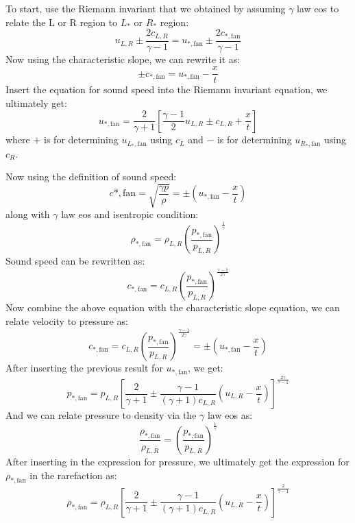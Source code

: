 To start, use the Riemann invariant that we obtained by assuming $\gamma$ law eos to relate
the L or R region to $L_*$ or $R_*$ region:
\begin{equation}
u_{L,R} \pm \frac{2c_{L,R}}{\gamma - 1} = u_{*,\mathrm{fan}} \pm \frac{2c_{*,\mathrm{fan}}}{\gamma - 1}
\end{equation}
Now using the characteristic slope, we can rewrite it as:
\begin{equation}
\pm c_{*,\mathrm{fan}} = u_{*,\mathrm{fan}} - \frac{x}{t}
\end{equation}
Insert the equation for sound speed into the Riemann invariant equation, we ultimately get:
\begin{equation}
u_{*,\mathrm{fan}} = \frac{2}{\gamma + 1} \left[ \frac{\gamma - 1}{2}u_{L,R} \pm c_{L,R} + \frac{x}{t}\right]
\end{equation}
where $+$ is for determining $u_{L_*,\mathrm{fan}}$ using $c_L$ and
$-$ is for determining $u_{R_*,\mathrm{fan}}$ using $c_R$.

Now using the definition of sound speed:
\begin{equation}
c{*,\mathrm{fan}} = \sqrt{\frac{\gamma p}{\rho}} = \pm (u_{*,\mathrm{fan}} - \frac{x}{t})
\end{equation}
along with $\gamma$ law eos and isentropic condition:
\begin{equation}
\rho_{*,\mathrm{fan}} = \rho_{L,R}\left( \frac{p_{*,\mathrm{fan}}}{p_{L,R}} \right)^{\frac{1}{\gamma}}
\end{equation}
Sound speed can be rewritten as:
\begin{equation}
c_{*,\mathrm{fan}} = c_{L,R} \left( \frac{p_{*,\mathrm{fan}}}{p_{L,R}} \right)^{\frac{\gamma - 1}{2 \gamma}}
\end{equation}
Now combine the above equation with the characteristic slope equation, we can relate velocity to pressure as:
\begin{equation}
c_{*,\mathrm{fan}} = c_{L,R} \left( \frac{p_{*,\mathrm{fan}}}{p_{L,R}} \right)^{\frac{\gamma - 1}{2 \gamma}} = \pm (u_{*,\mathrm{fan}} - \frac{x}{t})
\end{equation}
After inserting the previous result for $u_{*,\mathrm{fan}}$, we get:
\begin{equation}
p_{*,\mathrm{fan}} = p_{L,R} \left[\frac{2}{\gamma + 1} \pm \frac{\gamma - 1}{(\gamma + 1) c_{L,R}} \left(u_{L,R} - \frac{x}{t}\right)\right]^{\frac{2 \gamma}{\gamma - 1}}
\end{equation}
And we can relate pressure to density via the $\gamma$ law eos as:
\begin{equation}
\frac{\rho_{*,\mathrm{fan}}}{\rho_{L,R}} = \left(\frac{p_{*,\mathrm{fan}}}{p_{L,R}}\right)^{\frac{1}{\gamma}}
\end{equation}
After inserting in the expression for pressure, we ultimately get the expression for $\rho_{*,\mathrm{fan}}$ in the rarefaction as:
\begin{equation}
\rho_{*,\mathrm{fan}} = \rho_{L,R} \left[\frac{2}{\gamma + 1} \pm \frac{\gamma - 1}{(\gamma + 1) c_{L,R}} \left(u_{L,R} - \frac{x}{t}\right)\right]^{\frac{2}{\gamma - 1}}
\end{equation}

